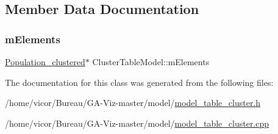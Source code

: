 \subsection{Member Data Documentation}
\mbox{\label{class_cluster_table_model_a8976691d944b9e33a830cd8f3b8f9c7c}} 
\subsubsection{\texorpdfstring{m\+Elements}{mElements}}
{\footnotesize\ttfamily \hyperlink{class_population__clustered}{Population\+\_\+clustered}$\ast$ Cluster\+Table\+Model\+::m\+Elements}



The documentation for this class was generated from the following files\+:\begin{DoxyCompactItemize}
\item 
/home/vicor/\+Bureau/\+G\+A-\/\+Viz-\/master/model/\hyperlink{model__table__cluster_8h}{model\+\_\+table\+\_\+cluster.\+h}\item 
/home/vicor/\+Bureau/\+G\+A-\/\+Viz-\/master/model/\hyperlink{model__table__cluster_8cpp}{model\+\_\+table\+\_\+cluster.\+cpp}\end{DoxyCompactItemize}
